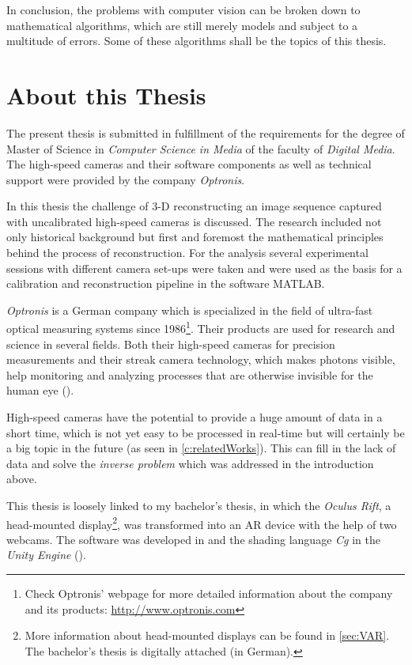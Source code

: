 In conclusion, the problems with computer vision can be broken down to mathematical algorithms, which are still merely models and subject to a multitude of errors. Some of these algorithms shall be the topics of this thesis.  
 
\section{About this Thesis}
The present thesis is submitted in fulfillment of the requirements for the degree of Master of Science in \textit{Computer Science in Media} of the faculty of \textit{Digital Media}. The high-speed cameras and their software components as well as technical support were provided by the company \textit{Optronis}.

In this thesis the challenge of 3-D reconstructing an image sequence captured with uncalibrated high-speed cameras is discussed. The research included not only historical background but first and foremost the mathematical principles behind the process of reconstruction. For the analysis several experimental sessions with different camera set-ups were taken and were used as the basis for a calibration and reconstruction pipeline in the software MATLAB.

\textit{Optronis} is a German company which is specialized in the field of ultra-fast optical measuring systems since 1986\footnote{Check Optronis' webpage for more detailed information about the company and its products: \url{http://www.optronis.com}}. Their products are used for research and science in several fields. Both their high-speed cameras for precision measurements and their streak camera technology, which makes photons visible, help monitoring and analyzing processes that are otherwise invisible for the human eye (\cite{Optronis.2016}).

High-speed cameras have the potential to provide a huge amount of data in a short time, which is not yet easy to be processed in real-time but will certainly be a big topic in the future (as seen in \autoref{c:relatedWorks}). This can fill in the lack of data and solve the \textit{inverse problem} which was addressed in the introduction above.

This thesis is loosely linked to my bachelor's thesis, in which the \textit{Oculus Rift}, a head-mounted display\footnote{More information about head-mounted displays can be found in \autoref{sec:VAR}. The  bachelor's thesis is digitally attached (in German).}, was transformed into an AR device with the help of two webcams. The software was developed in \CS and the shading language \textit{Cg} in the \textit{Unity Engine} (\cite{Haefele.2014}).  

